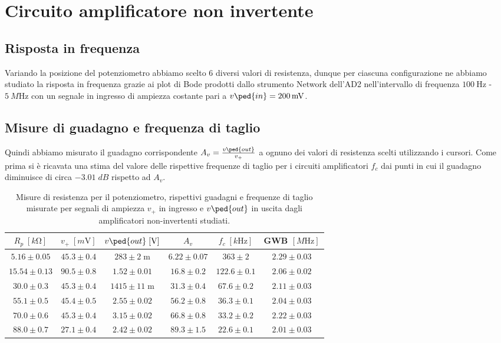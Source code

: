 \documentclass[10pt,a4paper]{article}
\begin{document}
\section{Circuito amplificatore non invertente}
\subsection{Risposta in frequenza}
Variando la posizione del potenziometro abbiamo scelto 6 diversi valori di
resistenza, dunque per ciascuna configurazione ne abbiamo studiato la risposta
in frequenza grazie ai plot di Bode prodotti dallo strumento Network dell'AD2
nell'intervallo di frequenza $\SI{100}{\Hz}$ - $\SI{5}{M\Hz}$ con un segnale
in ingresso di ampiezza costante pari a $v\ped{in} = \SI{200}{m\V}$.

\subsection{Misure di guadagno e frequenza di taglio}
Quindi abbiamo misurato il guadagno corrispondente
$A_v = \frac{v\ped{out}}{v_+}$ a ognuno dei valori di resistenza scelti
utilizzando i cursori.
Come prima si è ricavata una stima del valore delle rispettive frequenze di
taglio per i circuiti amplificatori $f_c$ dai punti in cui il guadagno
diminuisce di circa $-3.01 \; \si{dB}$ rispetto ad $A_v$. 
\begin{table}[htbp]
\centering
\begin{tabular}{cccccc}
\toprule
$R_p \; [\si{k\ohm}]$ & $v_+ \; [\si{m\V}]$ & $v\ped{out} \; [\si{\V}]$ & $A_v$ &
$f_c \; [\si{k\Hz}]$ & GWB $[\si{M\Hz}]$ \\
\midrule
\midrule
$5.16 \pm 0.05$ & $45.3 \pm 0.4$ & $283 \pm 2 \;$m & $6.22 \pm 0.07$ &
$363 \pm 2$ & $2.29 \pm 0.03$ \\
$15.54 \pm 0.13$ & $90.5 \pm 0.8$ & $1.52 \pm 0.01$ & $16.8 \pm 0.2$ &
$122.6 \pm 0.1$  & $2.06 \pm 0.02$ \\
$30.0 \pm 0.3$ & $45.3 \pm 0.4$  & $1415 \pm 11\;$m & $31.3 \pm 0.4$ &
$67.6 \pm 0.2$ & $2.11 \pm 0.03$ \\
$55.1 \pm 0.5$   & $45.4 \pm 0.5$ & $2.55 \pm 0.02$ & $56.2 \pm 0.8$ &
$36.3 \pm 0.1$ &  $2.04 \pm 0.03$ \\
$70.0 \pm 0.6$ & $45.3 \pm 0.4$ & $3.15 \pm 0.02$ & $66.8 \pm 0.8$ 	 &
$33.2 \pm 0.2$ & $2.22 \pm 0.03$ \\
$88.0 \pm 0.7$   & $27.1 \pm 0.4$ & $2.42 \pm 0.02$ & $89.3 \pm 1.5$ &
$22.6 \pm 0.1$ & $2.01 \pm 0.03$ \\
\bottomrule     
\end{tabular}
\caption{Misure di resistenza per il potenziometro, rispettivi guadagni e
frequenze di taglio misurate per segnali di ampiezza $v_+$ in ingresso e
$v\ped{out}$ in uscita dagli amplificatori non-invertenti studiati.
\label{tab: ampmes}}
\end{table}
\end{document}
